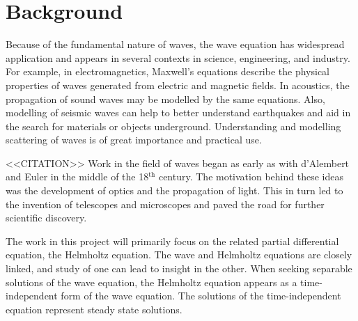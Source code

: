 \iffalse Brief outline of the chapter below

Background:
	What is HH equation?
	What does it model?
	How is it derived?
	Boundary conditions
	- 	Sommerfield radiation condition
	
Finite element method:
	Discretisation of HH
	Discretisation of infinite domains
		D,N,radiation
	ABC, DtN, PML

Linear solvers:
	Iterative and direct
	Krylov methods
	Preconditioners
	How does this relate to Poisson and HH?
	- 	Small wavenumbers good convergence

Project direction:
	Where are we going? What to do...?
	Multigrid in non-cartesian coordinates
	Fourier decompostion of HH
	Explore implementation of PMLs
\fi


\section{Background}

\iffalse
Motivation.
Who cares? Why is it difficult?
What are the benefits?
Need some citations? Names in the field...
\fi



Because of the fundamental nature of waves, the wave equation has widespread application and appears in several contexts in science, engineering, and industry.
For example, in electromagnetics, Maxwell's equations describe the physical properties of waves generated from electric and magnetic fields.
In acoustics, the propagation of sound waves may be modelled by the same equations.
Also, modelling of seismic waves can help to better understand earthquakes and aid in the search for materials or objects underground.
Understanding and modelling scattering of waves is of great importance and practical use.

<<CITATION>>
Work in the field of waves began as early as with d'Alembert and Euler in the middle of the 18$^\text{th}$ century.
The motivation behind these ideas was the development of optics and the propagation of light.
This in turn led to the invention of telescopes and microscopes and paved the road for further scientific discovery.

The work in this project will primarily focus on the related partial differential equation, the Helmholtz equation.
The wave and Helmholtz equations are closely linked, and study of one can lead to insight in the other.
When seeking separable solutions of the wave equation, the Helmholtz equation appears as a time-independent form of the wave equation.
The solutions of the time-independent equation represent steady state solutions.

